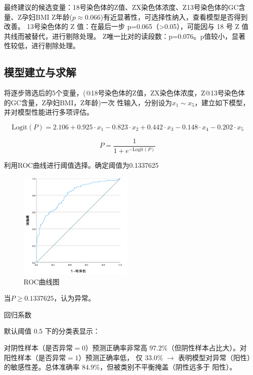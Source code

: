 \documentclass[withoutpreface,notoc]{cumcmthesis}
\begin{document}
	最终建议的候选变量：18号染色体的Z值、ZX染色体浓度、Z13号染色体的GC含量、Z孕妇BMI
	Z年龄($ p \approx 0.066 $)有近显著性，可选择性纳入，查看模型是否得到改善。
	13号染色体的 Z 值：在最后一步 p=0.065（>0.05），可能因与 18 号 Z 值共线而被替代，进行剔除处理。
	Z唯一比对的读段数：p=0.076。p值较小，显著性较低，进行剔除处理。

	\subsection{模型建立与求解}

	将逐步筛选后的5个变量，(@18号染色体的Z值，ZX染色体浓度，Z@13号染色体的GC含量，Z孕妇BMI，Z年龄)一次
	性输入，分别设为$\displaystyle x_{1}\sim x_{5}$，建立如下模型，并对模型性能进行多项评估。

	\begin{equation*}
	\label{logit}
	\text{Logit}(P) = 2.106 + 0.925 \cdot x_{1} - 0.823 \cdot x_{2} + 0.442 \cdot x_{3} - 0.148 \cdot x_{4} - 0.202 \cdot x_{5}
	\end{equation*}

	\begin{equation*}
	P = \frac{1}{1 + e^{-\mathrm{Logit}(P)}}
	\end{equation*}


	利用ROC曲线进行阈值选择。确定阈值为0.1337625
	\begin{figure}[ht]
		\centering
		\includegraphics[width=0.5\textwidth]{figures/ROC曲线.png} 
		\caption{ROC曲线图}
		\label{ROC曲线}
	\end{figure}

	当$P\geq0.1337625 $，认为异常。


	回归系数


	默认阈值 $0.5$ 下的分类表显示：

	对阴性样本（是否异常$=0$）预测正确率非常高 $97.2\%$（但阴性样本占比大）。对阳性样本（是否异常$=1$）预测正确率低，
	仅 $33.0\%$ $\rightarrow$ 表明模型对异常（阳性）的敏感性差。总体准确率 $84.9\%$，但被类别不平衡掩盖（阴性远多于
	阳性）。
\end{document}

